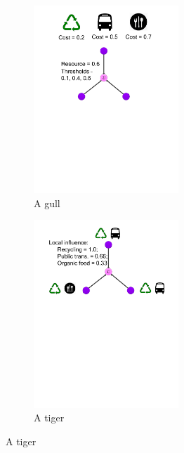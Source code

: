 \documentclass{article}
\begin{document}
\begin{figure}[htb]
       		   \begin{subfigure}[b]{0.6\textwidth}
                       \includegraphics[width=0.6\textwidth]{figs/timeline-1a}
                       \caption{A gull}
                       \label{fig:gull}
               \end{subfigure}
               
               \begin{subfigure}[b]{0.6\textwidth}
                       \includegraphics[width=0.6\textwidth]{figs/timeline-2a}
                       \caption{A tiger}
                       \label{fig:tiger}
               \end{subfigure}
               

\end{figure}
\end{document}
